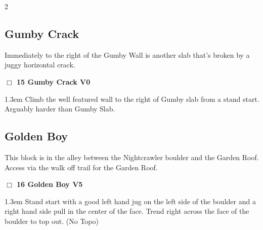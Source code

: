 \begin{multicols}{2}
\subsection*{Gumby Crack}\label{bf:Gumby Crack}
Immediately to the right of the Gumby Wall is another slab that's broken by a juggy horizontal crack.\\
\needspace{2em}
\label{rt:Gumby Crack}
\colorbox{green!20}{
\parbox{0.95\linewidth}{
\hspace{-1ex}\textbf{$\Box$
15 Gumby Crack V0  
}}}
\begin{adjustwidth}{1.3em}{}			
Climb the well featured wall to the right of Gumby slab from a stand start. Arguably harder than Gumby Slab.
\end{adjustwidth}
\needspace{10em}
\subsection*{Golden Boy}\label{bf:Golden Boy}
This block is in the alley between the Nightcrawler boulder and the Garden Roof. Access via the walk off trail for the Garden Roof.\\
\needspace{2em}
\label{rt:Golden Boy}
\colorbox{RoyalBlue!20}{
\parbox{0.95\linewidth}{
\hspace{-1ex}\textbf{$\Box$
16 Golden Boy V5  
}}}
\begin{adjustwidth}{1.3em}{}			
Stand start with a good left hand jug on the left side of the boulder and a right hand side pull in the center of the face. Trend right across the face of the boulder to top out.
  (No Topo)
\end{adjustwidth}
	\end{multicols}
\newpage
